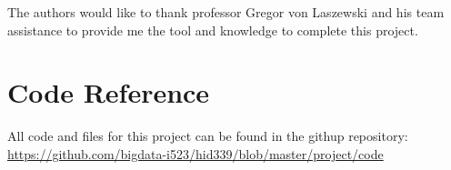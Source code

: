 \documentclass[sigconf]{acmart}
\begin{document}
\begin{acks}
The authors would like to thank professor Gregor von Laszewski and his team assistance to provide me the tool and knowledge to complete this project.
\end{acks}


 


\newpage
\appendix
\section{Code Reference}
All code and files for this project can be found in the githup repository:
\url{https://github.com/bigdata-i523/hid339/blob/master/project/code}
\end{document}
